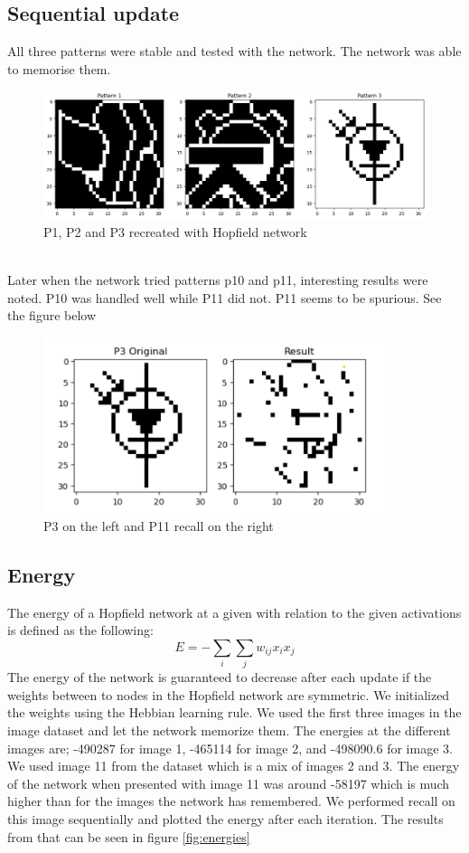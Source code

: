 \documentclass[a4paper]{article}
\begin{document}
\subsection{Sequential update}
All three patterns were stable and tested with the network. The network was able to memorise them. \\
\begin{figure}[htb]
    \centering
    \includegraphics[width=\textwidth]{Labs/Lab 3/Rakin/Results/3.2-3Patterns.png}
    \caption{P1, P2 and P3 recreated with Hopfield network }
    \label{fig:enter-label}
\end{figure}
\\Later when the network tried patterns p10 and p11, interesting results were noted. P10 was handled well while P11 did not. P11 seems to be spurious. See the figure below\\

\begin{figure}[htb]
    \centering
    \includegraphics[width=10cm]{Labs/Lab 3/Rakin/Results/3.2-p11.png}
    \caption{P3 on the left and P11 recall on the right}
    \label{fig:enter-label}
\end{figure}

\subsection{Energy}
The energy of a Hopfield network at a given with relation to the given activations is defined as the following:
$$
E = -\sum_i\sum_j w_{ij}x_ix_j
$$
The energy of the network is guaranteed to decrease after each update if the weights between to nodes in the Hopfield network are symmetric. We initialized the weights using the Hebbian learning rule. We used the first three images in the image dataset and let the network memorize them. The energies at the different images are; -490287 for image 1, -465114 for image 2, and -498090.6 for image 3. We used image 11 from the dataset which is a mix of images 2 and 3. The energy of the network when presented with image 11 was around -58197 which is much higher than for the images the network has remembered. We performed recall on this image sequentially and plotted the energy after each iteration. The results from that can be seen in figure \ref{fig:energies}
\end{document}
